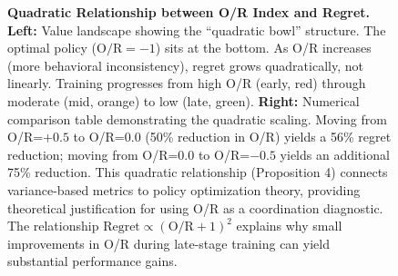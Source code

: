 \begin{figure}[t]

\caption{\textbf{Quadratic Relationship between O/R Index and Regret.}
\textbf{Left:} Value landscape showing the ``quadratic bowl'' structure. The optimal policy ($\text{O/R} = -1$) sits at the bottom. As O/R increases (more behavioral inconsistency), regret grows quadratically, not linearly. Training progresses from high O/R (early, red) through moderate (mid, orange) to low (late, green).
\textbf{Right:} Numerical comparison table demonstrating the quadratic scaling. Moving from O/R=$+0.5$ to O/R=$0.0$ (50\% reduction in O/R) yields a 56\% regret reduction; moving from O/R=$0.0$ to O/R=$-0.5$ yields an additional 75\% reduction. This quadratic relationship (Proposition 4) connects variance-based metrics to policy optimization theory, providing theoretical justification for using O/R as a coordination diagnostic.
The relationship $\text{Regret} \propto (\text{O/R} + 1)^2$ explains why small improvements in O/R during late-stage training can yield substantial performance gains.}
\label{fig:quadratic_or_regret}
\end{figure}
